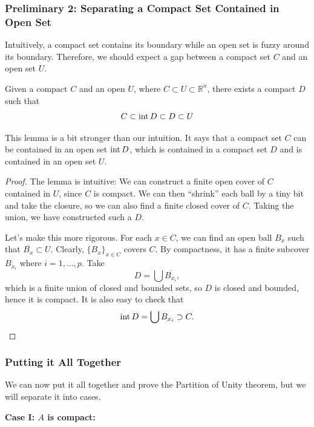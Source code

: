 \documentclass{article}
\numberwithin{equation}{section}
\begin{document}
\subsubsection{Preliminary 2: Separating a Compact Set Contained in Open Set}
Intuitively, a compact set contains its boundary while an open set is fuzzy around its boundary. Therefore, we should expect a gap between a compact set $C$ and an open set $U$.
\begin{lemma}
    Given a compact $C$ and an open $U$, where $C \subset U \subset \mathbb{R}^n$, there exists a compact $D$ such that 
    \begin{equation}
        C \subset \operatorname{int} D \subset D \subset U
    \end{equation}
\end{lemma}
This lemma is a bit stronger than our intuition. It says that a compact set $C$ can be contained in an open set $\operatorname{int} D$, which is contained in a compact set $D$ and is contained in an open set $U$.
\begin{proof}
    The lemma is intuitive: We can construct a finite open cover of $C$ contained in $U$, since $C$ is compact. We can then ``shrink'' each ball by a tiny bit and take the closure, so we can also find a finite closed cover of $C$. Taking the union, we have constructed such a $D$.

    Let's make this more rigorous. For each $x\in C$, we can find an open ball $B_x$ such that $\overline{B_x}\subset U.$  Clearly, $\{B_x\}_{x\in C}$ covers $C$. By compactness, it has a finite subcover $B_{x_i}$ where $i=1,\dots, p.$ Take 
    \begin{equation}
        D = \bigcup \overline{B_{x_i}},
    \end{equation}
    which is a finite union of closed and bounded sets, so $D$ is closed and bounded, hence it is compact. It is also easy to check that 
    \begin{equation}
        \operatorname{int} D = \bigcup B_{x_i} \supset C.
    \end{equation}
\end{proof}
\subsubsection{Putting it All Together}
We can now put it all together and prove the Partition of Unity theorem, but we will separate it into cases.

\textbf{Case I: $A$ is compact:}
\end{document}
